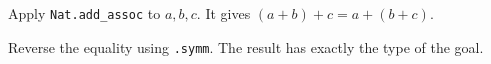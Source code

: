 Apply \texttt{Nat.add_assoc} to $a,b,c$. It gives $(a+b)+c=a+(b+c)$.

Reverse the equality using \texttt{.symm}. The result has exactly the type of the goal.

